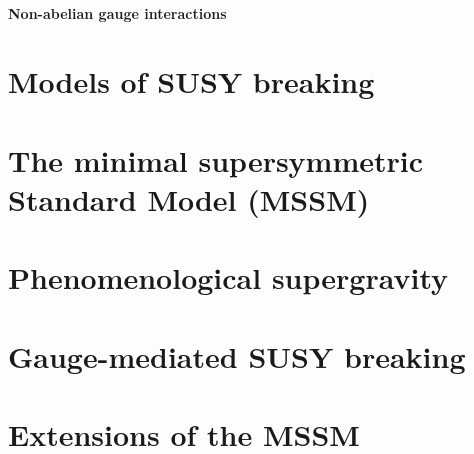 \paragraph{Non-abelian gauge interactions}
\section{Models of SUSY breaking}
\section{The minimal supersymmetric Standard Model (MSSM)}
\section{Phenomenological supergravity}
\section{Gauge-mediated SUSY breaking}
\section{Extensions of the MSSM}

